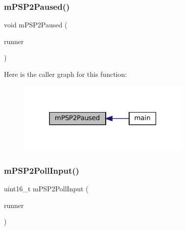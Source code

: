 \subsubsection{\texorpdfstring{m\+P\+S\+P2\+Paused()}{mPSP2Paused()}}
{\footnotesize\ttfamily void m\+P\+S\+P2\+Paused (\begin{DoxyParamCaption}\item[{struct \mbox{\hyperlink{structm_g_u_i_runner}{m\+G\+U\+I\+Runner}} $\ast$}]{runner }\end{DoxyParamCaption})}

Here is the caller graph for this function\+:
\nopagebreak
\begin{figure}[H]
\begin{center}
\leavevmode
\includegraphics[width=243pt]{psp2-context_8h_a7f9c754e1ebf551ba6e39e76d7135f91_icgraph}
\end{center}
\end{figure}
\mbox{\label{psp2-context_8h_a29b280976db23268da118020f60ce728}} 
\subsubsection{\texorpdfstring{m\+P\+S\+P2\+Poll\+Input()}{mPSP2PollInput()}}
{\footnotesize\ttfamily uint16\+\_\+t m\+P\+S\+P2\+Poll\+Input (\begin{DoxyParamCaption}\item[{struct \mbox{\hyperlink{structm_g_u_i_runner}{m\+G\+U\+I\+Runner}} $\ast$}]{runner }\end{DoxyParamCaption})}

